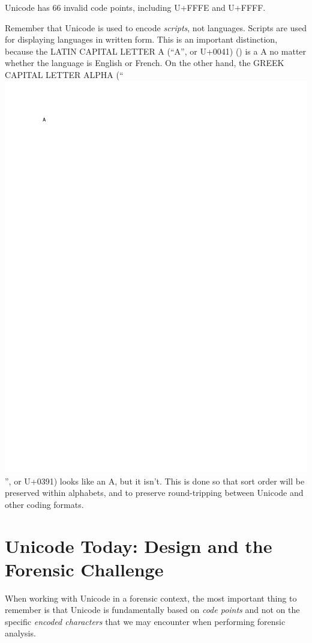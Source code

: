 Unicode has 66 invalid code points, including U+FFFE and U+FFFF.

Remember that Unicode is used to encode \emph{scripts}, not languages. Scripts are used for displaying languages in written form. This is an important distinction, because the LATIN CAPITAL LETTER A (``A'', or U+0041) () is a A no matter whether the language is English or French. On the other hand, the GREEK CAPITAL LETTER ALPHA (``\includegraphics{uni/unicode_alpha}'', or U+0391) looks like an A, but it isn't. This is done so that sort order will be preserved within alphabets, and to preserve round-tripping between Unicode and other coding formats.

\section{Unicode Today: Design and the Forensic Challenge}

When working with Unicode in a forensic context, the most important
thing to remember is that Unicode is fundamentally based on \emph{code
points} and not on the specific \emph{encoded characters} that we may
encounter when performing forensic analysis.

